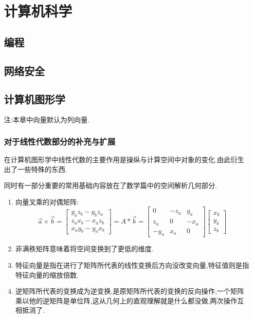 \documentclass[UTF8,12pt]{ctexbook}
\begin{document}
\chapter{计算机科学}{

  \section{编程}{


   }%

  \section{网络安全}{


   }%

  \section{计算机图形学}{
    注:本章中向量默认为列向量.

    \subsection{对于线性代数部分的补充与扩展}{

      在计算机图形学中线性代数的主要作用是操纵与计算空间中对象的变化.由此衍生出了一些特殊的东西.

      同时有一部分重要的常用基础内容放在了数学篇中的空间解析几何部分.

      \begin{enumerate}
        \item {向量叉乘的对偶矩阵:
              $$\vec{a} \times \vec{b}
                =
                \begin{bmatrix}
                  y_az_b - y_bz_a \\
                  z_ax_b - x_az_b \\
                  x_ay_b - y_ax_b
                \end{bmatrix}
                =
                A * \vec{b}
                =
                \begin{bmatrix}
                  0    & -z_a & y_a  \\
                  z_a  & 0    & -x_a \\
                  -y_a & x_a  & 0
                \end{bmatrix}
                \begin{bmatrix}
                  x_b \\
                  y_b \\
                  z_b
                \end{bmatrix}
              $$
              }
        \item 非满秩矩阵意味着将空间变换到了更低的维度.
        \item 特征向量是指在进行了矩阵所代表的线性变换后方向没改变向量,特征值则是指特征向量的缩放倍数.
        \item 逆矩阵所代表的变换成为逆变换,是原矩阵所代表的变换的反向操作,一个矩阵乘以他的逆矩阵是单位阵,这从几何上的直观理解就是什么都没做,两次操作互相抵消了.
      \end{enumerate}
    }

}}
\end{document}
